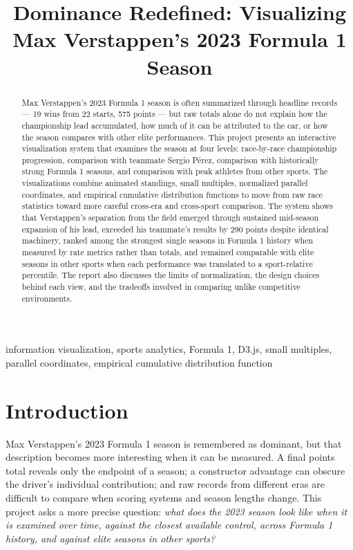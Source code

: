 \documentclass[conference]{IEEEtran}
\begin{document}
\title{Dominance Redefined: Visualizing Max Verstappen's 2023 Formula 1 Season}

\author{
}

\maketitle

\begin{abstract}
Max Verstappen's 2023 Formula 1 season is often summarized through headline records --- 19 wins from 22 starts, 575 points --- but raw totals alone do not explain how the championship lead accumulated, how much of it can be attributed to the car, or how the season compares with other elite performances. This project presents an interactive visualization system that examines the season at four levels: race-by-race championship progression, comparison with teammate Sergio P\'erez, comparison with historically strong Formula 1 seasons, and comparison with peak athletes from other sports. The visualizations combine animated standings, small multiples, normalized parallel coordinates, and empirical cumulative distribution functions to move from raw race statistics toward more careful cross-era and cross-sport comparison. The system shows that Verstappen's separation from the field emerged through sustained mid-season expansion of his lead, exceeded his teammate's results by 290 points despite identical machinery, ranked among the strongest single seasons in Formula 1 history when measured by rate metrics rather than totals, and remained comparable with elite seasons in other sports when each performance was translated to a sport-relative percentile. The report also discusses the limits of normalization, the design choices behind each view, and the tradeoffs involved in comparing unlike competitive environments.
\end{abstract}

\begin{IEEEkeywords}
information visualization, sports analytics, Formula 1, D3.js, small multiples, parallel coordinates, empirical cumulative distribution function
\end{IEEEkeywords}

\section{Introduction}
Max Verstappen's 2023 Formula 1 season is remembered as dominant, but that description becomes more interesting when it can be measured. A final points total reveals only the endpoint of a season; a constructor advantage can obscure the driver's individual contribution; and raw records from different eras are difficult to compare when scoring systems and season lengths change. This project asks a more precise question: \emph{what does the 2023 season look like when it is examined over time, against the closest available control, across Formula 1 history, and against elite seasons in other sports?}
\end{document}
